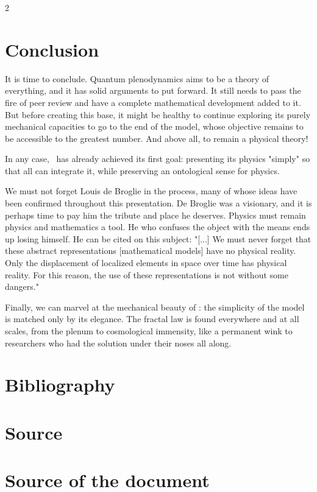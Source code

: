 \begin{multicols}{2}
	\section{Conclusion} 
	
	It is time to conclude. Quantum plenodynamics aims to be a theory of everything, and it has solid arguments to put forward. It still needs to pass the fire of peer review and have a complete mathematical development added to it. But before creating this base, it might be healthy to continue exploring its purely mechanical capacities to go to the end of the model, whose objective remains to be accessible to the greatest number. And above all, to remain a physical theory!
	
	In any case, \PQ\ has already achieved its first goal: presenting its physics "simply" so that all can integrate it, while preserving an ontological sense for physics.
	
	We must not forget Louis de Broglie in the process, many of whose ideas have been confirmed throughout this presentation. De Broglie was a visionary, and it is perhaps time to pay him the tribute and place he deserves. Physics must remain physics and mathematics a tool. He who confuses the object with the means ends up losing himself. He can be cited on this subject: "[...] We must never forget that these abstract representations [mathematical models] have no physical reality. Only the displacement of localized elements in space over time has physical reality. For this reason, the use of these representations is not without some dangers." \cite{debroglie1976physique}
	
	Finally, we can marvel at the mechanical beauty of \PQ: the simplicity of the model is matched only by its elegance. The fractal law is found everywhere and at all scales, from the plenum to cosmological immensity, like a permanent wink to researchers who had the solution under their noses all along.
	
	\section{Bibliography}
	\printbibliography
	
	\section{Source}
	\section*{Source of the document}
	

\end{multicols}
